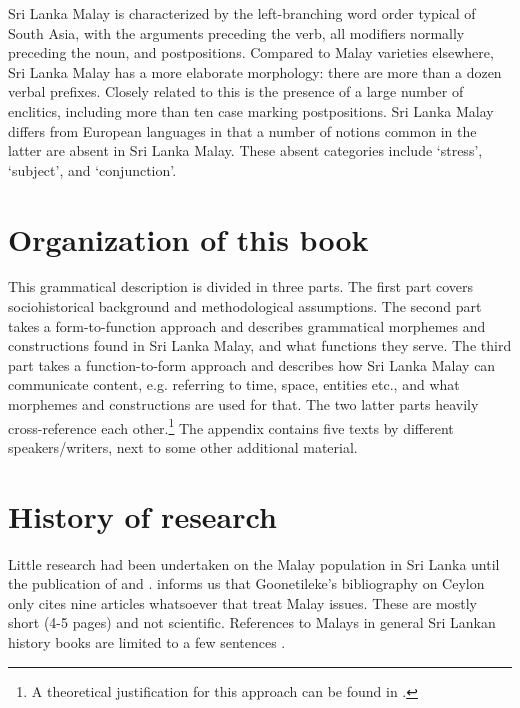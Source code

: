 \begin{figure}[p]
\end{figure}

Sri Lanka Malay is characterized by the left-branching word order typical of South Asia, with the arguments preceding the verb, all modifiers normally preceding the noun, and postpositions.
Compared to Malay varieties elsewhere, Sri Lanka Malay has a more elaborate morphology: there are more than a dozen verbal prefixes. Closely related to this is the presence of a large number of enclitics, including more than ten case marking postpositions.
Sri Lanka Malay differs from European languages in that a number of notions common in the latter are absent in Sri Lanka Malay. These absent categories include `stress', `subject', and `conjunction'.

\section{Organization of this book}
This grammatical description is divided in three parts. The first part covers sociohistorical background and methodological assumptions. The second part takes a form-to-function approach and describes  grammatical morphemes and  constructions found in Sri Lanka Malay, and what functions they serve. The third part takes a function-to-form approach and describes how Sri Lanka Malay can communicate content, e.g. referring to time, space, entities etc., and what morphemes and constructions are used for that. The two latter parts heavily cross-reference each other.\footnote{A theoretical justification for this approach can be found in \citet{Nordhoff2008jldc}.} The appendix contains five texts by different speakers/writers, next to some other additional material.


 
 

% 
 
\section{History of research}
Little research had been undertaken on the Malay population in Sri Lanka until the publication of \citet{Bichsel} and \citet{Hussainmiya1987,Hussainmiya1990}. \citet[7,22]{Hussainmiya1990} informs us that
Goonetileke's  bibliography on Ceylon \nocite{Goonetileke19701983}
 only cites nine articles whatsoever that treat Malay issues. These are
mostly short (4-5 pages) and not scientific. 
References to Malays in general Sri Lankan history books are limited to a few sentences \citep{Bichsel}. 


